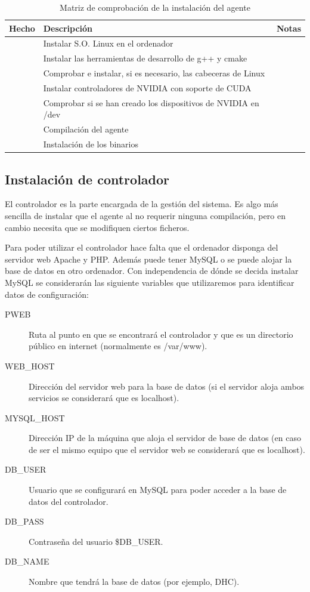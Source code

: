 \begin{table}
	\centering
	
	\begin{tabular}{|c|p{5.6cm}|p{5.6cm}|}
	\hline
	Hecho & Descripción & Notas\\
	\hline
	& Instalar S.O. Linux en el ordenador & \\
	\hline
	& Instalar las herramientas de desarrollo de g++ y cmake & \\
	\hline
	& Comprobar e instalar, si es necesario, las cabeceras de Linux & \\
	\hline
	& Instalar controladores de NVIDIA con soporte de CUDA & \\
	\hline
	& Comprobar si se han creado los dispositivos de NVIDIA en /dev & \\
	\hline
	& Compilación del agente & \\
	\hline
	& Instalación de los binarios &\\
	\hline
	\end{tabular}
	
	\caption{Matriz de comprobación de la instalación del agente}\label{tab:mat_agente}
\end{table}

\subsection{Instalación de controlador}

El controlador es la parte encargada de la gestión del sistema. Es algo más sencilla de instalar que el agente al no requerir ninguna compilación, pero en cambio necesita que se modifiquen ciertos ficheros.

Para poder utilizar el controlador hace falta que el ordenador disponga del servidor web Apache y PHP. Además puede tener MySQL o se puede alojar la base de datos en otro ordenador. Con independencia de dónde se decida instalar MySQL se considerarán las siguiente variables que utilizaremos para identificar datos de configuración:

\begin{description}
	\item[PWEB] Ruta al punto en que se encontrará el controlador y que es un directorio público en internet (normalmente es /var/www).
	\item[WEB\_HOST] Dirección del servidor web para la base de datos (si el servidor aloja ambos servicios se considerará que es localhost).
	\item[MYSQL\_HOST] Dirección IP de la máquina que aloja el servidor de base de datos (en caso de ser el mismo equipo que el servidor web se considerará que es localhost).
	\item[DB\_USER] Usuario que se configurará en MySQL para poder acceder a la base de datos del controlador.
	\item[DB\_PASS] Contraseña del usuario \$DB\_USER.
	\item[DB\_NAME] Nombre que tendrá la base de datos (por ejemplo, DHC).
\end{description}

